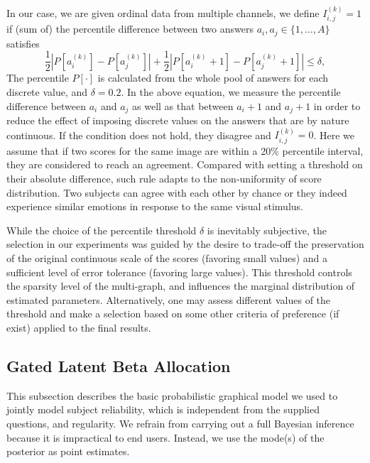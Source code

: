 \documentclass[10pt,journal,letterpaper,compsoc,twoside]{IEEEtran}
\begin{document}
In our case, we are given ordinal data from multiple channels, 
we define $I_{i,j}^{(k)}=1$ if (sum of) the percentile difference
between two answers $a_i,a_j\in \{1,\ldots,A\}$ satisfies
\begin{equation}
\dfrac{1}{2}\left\lvert P\left[a_i^{(k)}\right] - P\left[a_j^{(k)}\right] \right\rvert
+\dfrac{1}{2}\left\lvert P\left[a_i^{(k)}\!\!+\!\!1\right] - P\left[a_j^{(k)}\!\!+\!\!1\right] \right\rvert \le \delta,
\end{equation} 
The percentile $P[\cdot]$ is calculated from the 
whole pool of answers for each discrete value, and $\delta = 0.2$.
In the above equation, we measure the percentile difference between $a_i$ and $a_j$ as well as that
between $a_i+1$ and $a_j+1$ in order to reduce the effect of imposing discrete values on the answers that are by nature continuous. 
If the condition does not hold, they disagree and $I_{i,j}^{(k)}=0$.
Here we assume that if two scores for the same image 
are within a 20\% percentile interval,
they are considered to reach an agreement. 
Compared with setting a threshold on their absolute difference, such rule
adapts to the non-uniformity of score distribution.
Two subjects can agree with each other by chance or they 
indeed experience similar emotions in response to the same visual stimulus.

{While the choice of the percentile threshold $\delta$ is inevitably subjective, the selection in our experiments was guided by the desire to trade-off the preservation of the original continuous scale of the scores (favoring small values) and a sufficient level of error tolerance (favoring large values). This threshold controls the sparsity level of the multi-graph, and influences the marginal distribution of estimated parameters. Alternatively, one may assess different values of the threshold and make a selection based on some other criteria of preference (if exist) applied to the final results.}

\subsection{Gated Latent Beta Allocation}
This subsection describes the basic probabilistic graphical model we used to 
jointly model subject reliability, which
is independent from the supplied questions, and regularity. We refrain from carrying out a full
Bayesian inference because it is impractical to end users. Instead, we use the mode(s) of the posterior as point estimates.
\end{document}
